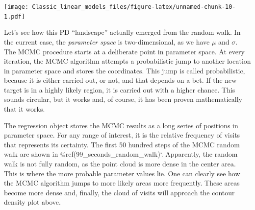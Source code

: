 \documentclass[]{svmono}
\newenvironment{Shaded}{\begin{snugshade}}{\end{snugshade}}
\newcommand{\KeywordTok}[1]{\textcolor[rgb]{0.13,0.29,0.53}{\textbf{#1}}}
\newcommand{\DataTypeTok}[1]{\textcolor[rgb]{0.13,0.29,0.53}{#1}}
\newcommand{\DecValTok}[1]{\textcolor[rgb]{0.00,0.00,0.81}{#1}}
\newcommand{\StringTok}[1]{\textcolor[rgb]{0.31,0.60,0.02}{#1}}
\newcommand{\OperatorTok}[1]{\textcolor[rgb]{0.81,0.36,0.00}{\textbf{#1}}}
\newcommand{\NormalTok}[1]{#1}
\theoremstyle{definition}
\theoremstyle{definition}
\theoremstyle{definition}
\theoremstyle{remark}
\begin{document}
\begin{Shaded}
\end{Shaded}

\texttt{[image: Classic\_linear\_models\_files/figure-latex/unnamed-chunk-10-1.pdf]}

Let's see how this PD ``landscape'' actually emerged from the random
walk. In the current case, the \emph{parameter space} is
two-dimensional, as we have \(\mu\) and \(\sigma\). The MCMC procedure
starts at a deliberate point in parameter space. At every iteration, the
MCMC algorithm attempts a probabilistic jump to another location in
parameter space and stores the coordinates. This jump is called
probabilistic, because it is either carried out, or not, and that
depends on a bet. If the new target is in a highly likely region, it is
carried out with a higher chance. This sounds circular, but it works
and, of course, it has been proven mathematically that it works.

The regression object stores the MCMC results as a long series of
positions in parameter space. For any range of interest, it is the
relative frequency of visits that represents its certainty. The first 50
hundred steps of the MCMC random walk are shown in
@ref(99\_seconds\_random\_walk)`. Apparently, the random walk is not
fully random, as the point cloud is more dense in the center area. This
is where the more probable parameter values lie. One can clearly see how
the MCMC algorithm jumps to more likely areas more frequently. These
areas become more dense and, finally, the cloud of visits will approach
the contour density plot above.
\end{document}
